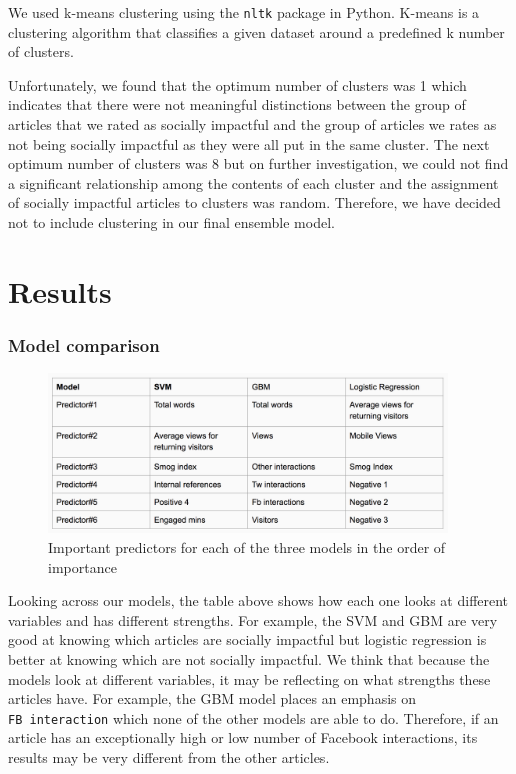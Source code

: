 \documentclass[10pt,letterpaper]{article}
\begin{document}
We used k-means clustering using the \texttt{nltk} package in Python.
K-means is a clustering algorithm that classifies a given dataset around
a predefined k number of clusters.

Unfortunately, we found that the optimum number of clusters was 1 which
indicates that there were not meaningful distinctions between the group
of articles that we rated as socially impactful and the group of
articles we rates as not being socially impactful as they were all put
in the same cluster. The next optimum number of clusters was 8 but on
further investigation, we could not find a significant relationship
among the contents of each cluster and the assignment of socially
impactful articles to clusters was random. Therefore, we have decided
not to include clustering in our final ensemble model.

\hypertarget{results}{%
\section{Results}\label{results}}

\hypertarget{model-comparison}{%
\subsubsection{Model comparison}\label{model-comparison}}

\begin{figure}
\includegraphics[width=400px]{model-comp-II} \caption{Important predictors for each of the three models in the order of importance}\label{fig:unnamed-chunk-6}
\end{figure}

Looking across our models, the table above shows how each one looks at
different variables and has different strengths. For example, the SVM
and GBM are very good at knowing which articles are socially impactful
but logistic regression is better at knowing which are not socially
impactful. We think that because the models look at different variables,
it may be reflecting on what strengths these articles have. For example,
the GBM model places an emphasis on \texttt{FB\ interaction} which none
of the other models are able to do. Therefore, if an article has an
exceptionally high or low number of Facebook interactions, its results
may be very different from the other articles.
\end{document}
